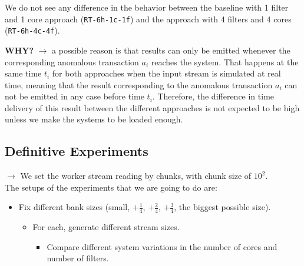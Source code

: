 \documentclass[12pt,a4paper]{article}
\begin{document}
We do not see any difference in the behavior between the baseline with 1 filter and 1 core approach (\texttt{RT-6h-1c-1f}) and the approach with 4 filters and 4 cores (\texttt{RT-6h-4c-4f}). 

\textbf{WHY?} $\rightarrow$ a possible reason is that results can only be emitted whenever the corresponding anomalous transaction $a_i$ reaches the system. That happens at the same time $t_i$ for both approaches when the input stream is simulated at real time, meaning that the result corresponding to the anomalous transaction $a_i$ can not be emitted in any case before time $t_i$. Therefore, the difference in time delivery of this result between the different approaches is not expected to be high unless we make the systems to be loaded enough.

\subsection{Definitive Experiments}

$\rightarrow$ We set the worker stream reading by chunks, with chunk size of $10^2$.\\

The setups of the experiments that we are going to do are:
\begin{itemize}
  \item Fix different bank sizes (small, $+\frac{1}{4}$, $+\frac{2}{4}$, $+\frac{3}{4}$, the biggest possible size).
  \begin{itemize}
    \item For each, generate different stream sizes.
    \begin{itemize}
      \item Compare different system variations in the number of cores and number of filters.
    \end{itemize}
  \end{itemize}
\end{itemize}
\end{document}

